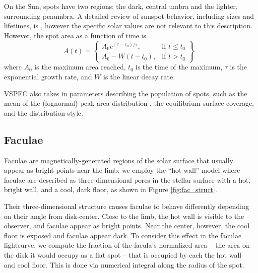 \documentclass[twocolumn]{aastex631}
\begin{document}
On the Sun, spots have two regions: the dark, central umbra and the lighter, surrounding penumbra. A detailed review of sunspot behavior,
including sizes and lifetimes, is \citet{solanki2003}, however the specific solar values are not relevant to this description. However,
the spot area as a function of time is
\begin{equation}
    A(t) = \left\{
    \begin{array}{lr}
        A_0 e^{(t-t_0)/\tau}, & \text{if } t \leq t_0 \\
        A_0 - W(t-t_0), & \text{if } t > t_0
    \end{array}
    \right\}
\end{equation}
where $A_0$ is the maximum area reached, $t_0$ is the time of the maximum, $\tau$ is the exponential growth rate, and $W$ is the linear decay rate.

{\sc VSPEC} also takes in parameters describing the population of spots, such as the mean of the (lognormal) peak area distribution
\citep{bogdan1988}, the equilibrium surface coverage, and the distribution style.

\subsection{Faculae \label{subsec:faculae}}
Faculae are magnetically-generated regions of the solar surface that usually appear as bright points near the limb; we employ the ``hot wall''
model \citep{spruit1976} where faculae are described as three-dimensional pores in the stellar surface with a hot, bright wall, and a
cool, dark floor, as shown in Figure \ref{fig:fac_struct}.

Their three-dimensional structure causes faculae to behave differently depending on their angle from disk-center. Close to the limb,
the hot wall is visible to the observer, and faculae appear as bright points. Near the center, however, the cool floor is exposed and
faculae appear dark. To consider this effect in the faculae lightcurve, we compute the fraction of the facula's normalized area -- the
area on the disk it would occupy as a flat spot -- that is occupied by each the hot wall and cool floor. This is done via numerical integral
along the radius of the spot.
\end{document}
